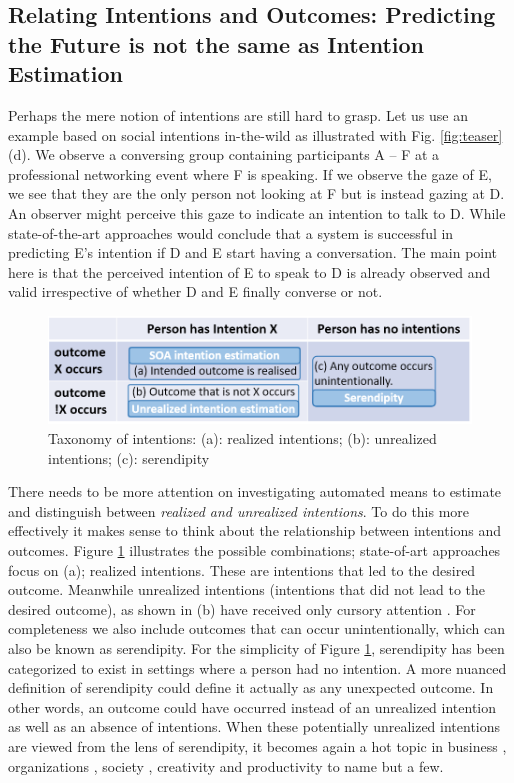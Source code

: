 \documentclass[manuscript,screen,review]{acmart}
\begin{document}
\subsection{Relating Intentions and Outcomes: Predicting the Future is not the same as Intention Estimation}

Perhaps the mere notion of intentions are still hard to grasp. Let us use an example based on  social intentions in-the-wild as illustrated with Fig. \ref{fig:teaser} (d). We observe a conversing group containing participants A -- F at a professional networking event where F is speaking.  If we observe the gaze of E, we see that they are the only person not looking at F but is instead gazing at D. An observer might perceive this gaze to indicate an intention to talk to D. While state-of-the-art approaches would conclude that a system is successful in predicting E's intention if D and E start having a conversation. The main point here is that the perceived intention of E to speak to D is already observed and valid irrespective of whether D and E finally converse or not. 

\begin{figure}[tb]
    \includegraphics[width=\columnwidth]{samples/IntentQuad.png}
    \vspace{-5mm}
    \caption{Taxonomy of intentions: (a): realized intentions; (b): unrealized intentions; (c): serendipity}
    \vspace{-5mm}
    \label{fig:intent}
\end{figure}
There needs to be more attention on investigating automated means to estimate and distinguish between \emph{realized and unrealized intentions}. To do this more effectively it makes sense to think about the relationship between intentions and outcomes. Figure \ref{fig:intent} illustrates the possible combinations; state-of-art approaches focus on (a); realized intentions. These are intentions that led to the desired outcome. Meanwhile unrealized intentions (intentions that did not lead to the desired outcome), as shown in (b) have received only cursory attention \cite{wlodarczak2020breathing,Rasouli2019PIE}. For completeness we also include outcomes that can occur unintentionally, which can also be known as serendipity. For the simplicity of Figure \ref{fig:intent}, serendipity has been categorized to exist in settings where a person had no intention. A more nuanced definition of serendipity could define it actually as any unexpected outcome. In other words, an outcome could have occurred instead of an unrealized intention as well as an absence of intentions. When these potentially unrealized intentions are viewed from the lens of serendipity, it becomes again a hot topic in business \cite{Busch2020,Lane2021}, organizations \cite{eagle2004can,10.1145/2531602.2531641}, society \cite{Chan2019}, creativity and productivity \cite{gratton2020increase,meluso2020making} to name but a few. 
\end{document}
